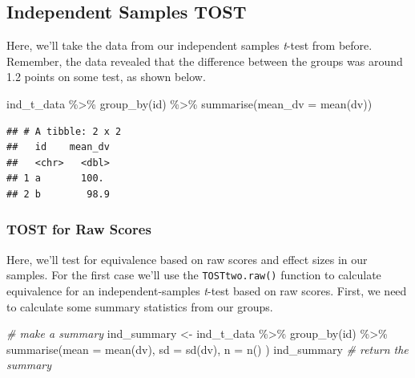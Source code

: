\documentclass[
]{book}
\newenvironment{Shaded}{\begin{snugshade}}{\end{snugshade}}
\newcommand{\AttributeTok}[1]{\textcolor[rgb]{0.77,0.63,0.00}{#1}}
\newcommand{\CommentTok}[1]{\textcolor[rgb]{0.56,0.35,0.01}{\textit{#1}}}
\newcommand{\FunctionTok}[1]{\textcolor[rgb]{0.00,0.00,0.00}{#1}}
\newcommand{\NormalTok}[1]{#1}
\newcommand{\OtherTok}[1]{\textcolor[rgb]{0.56,0.35,0.01}{#1}}
\newcommand{\SpecialCharTok}[1]{\textcolor[rgb]{0.00,0.00,0.00}{#1}}
\begin{document}
\hypertarget{independent-samples-tost}{%
\subsection{Independent Samples TOST}\label{independent-samples-tost}}

Here, we'll take the data from our independent samples \emph{t}-test from before. Remember, the data revealed that the difference between the groups was around 1.2 points on some test, as shown below.

\begin{Shaded}
\begin{Highlighting}[]
\NormalTok{ind\_t\_data }\SpecialCharTok{\%\textgreater{}\%} \FunctionTok{group\_by}\NormalTok{(id) }\SpecialCharTok{\%\textgreater{}\%} \FunctionTok{summarise}\NormalTok{(}\AttributeTok{mean\_dv =} \FunctionTok{mean}\NormalTok{(dv))}
\end{Highlighting}
\end{Shaded}

\begin{verbatim}
## # A tibble: 2 x 2
##   id    mean_dv
##   <chr>   <dbl>
## 1 a       100. 
## 2 b        98.9
\end{verbatim}

\hypertarget{tost-for-raw-scores}{%
\subsubsection{TOST for Raw Scores}\label{tost-for-raw-scores}}

Here, we'll test for equivalence based on raw scores and effect sizes in our samples. For the first case we'll use the \texttt{TOSTtwo.raw()} function to calculate equivalence for an independent-samples \emph{t}-test based on raw scores. First, we need to calculate some summary statistics from our groups.

\begin{Shaded}
\begin{Highlighting}[]
\CommentTok{\# make a summary}
\NormalTok{ind\_summary }\OtherTok{\textless{}{-}}\NormalTok{ ind\_t\_data }\SpecialCharTok{\%\textgreater{}\%} 
  \FunctionTok{group\_by}\NormalTok{(id) }\SpecialCharTok{\%\textgreater{}\%} 
  \FunctionTok{summarise}\NormalTok{(}\AttributeTok{mean =} \FunctionTok{mean}\NormalTok{(dv),}
            \AttributeTok{sd =} \FunctionTok{sd}\NormalTok{(dv),}
            \AttributeTok{n =} \FunctionTok{n}\NormalTok{()}
\NormalTok{            )}
\NormalTok{ind\_summary }\CommentTok{\# return the summary}
\end{Highlighting}
\end{Shaded}
\end{document}
